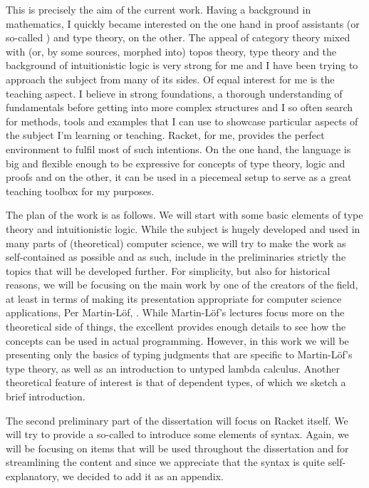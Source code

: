 This is precisely the aim of the current work. Having a background in
mathematics, I quickly became interested on the one hand in proof assistants
(or so-called ) and type theory, on the other.
The appeal of category theory mixed with (or, by some sources, morphed into)
topos theory, type theory and the background of intuitionistic logic is
very strong for me and I have been trying to approach the subject from
many of its sides. Of equal interest for me is the teaching aspect.
I believe in strong foundations, a thorough understanding of fundamentals
before getting into more complex structures and I so often search for
methods, tools and examples that I can use to showcase particular aspects
of the subject I'm learning or teaching. Racket, for me, provides the perfect
environment to fulfil most of such intentions. On the one hand, the language
is big and flexible enough to be expressive for concepts of type theory,
logic and proofs and on the other, it can be used in a piecemeal setup
to serve as a great teaching toolbox for my purposes.

\vspace{0.3cm}

The plan of the work is as follows. We will start with some basic elements
of type theory and intuitionistic logic. While the subject is hugely developed
and used in many parts of (theoretical) computer science, we will try to make
the work as self-contained as possible and as such, include in the preliminaries
strictly the topics that will be developed further. For simplicity, but also
for historical reasons, we will be focusing on the main work by one of
the creators of the field, at least in terms of making its presentation
appropriate for computer science applications, Per Martin-L\"{o}f, \cite{mltt}.
While Martin-L\"{o}f's lectures focus more on the theoretical side of things,
the excellent \cite{pmltt} provides enough details to see how the concepts
can be used in actual programming. However, in this work we will be presenting
only the basics of typing judgments that are specific to Martin-L\"{o}f's
type theory, as well as an introduction to untyped lambda calculus. Another
theoretical feature of interest is that of dependent types, of which we sketch
a brief introduction.

The second preliminary part of the dissertation will focus on Racket itself.
We will try to provide a so-called  to introduce some
elements of syntax. Again, we will be focusing on items that will be used
throughout the dissertation and for streamlining the content and since we appreciate
that the syntax is quite self-explanatory, we decided to add it as an appendix.

